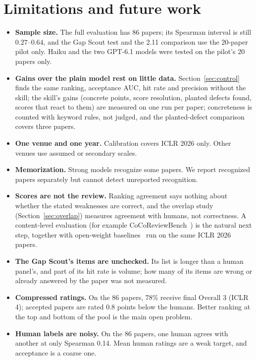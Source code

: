 \documentclass[11pt,a4paper]{article}
\begin{document}
\section{Limitations and future work}
\begin{itemize}
\item \textbf{Sample size.} The full evaluation has 86 papers; its Spearman interval is still
$0.27$--$0.64$, and the Gap Scout test and the 2.11 comparison use the 20-paper pilot only.
Haiku and the two GPT-6.1 models were tested on the pilot's 20 papers only.
\item \textbf{Gains over the plain model rest on little data.} Section~\ref{sec:control} finds
the same ranking, acceptance AUC, hit rate and precision without the skill; the skill's gains
(concrete points, score resolution, planted defects found, scores that react to them) are
measured on one run per paper; concreteness is counted with keyword rules, not judged, and the
planted-defect comparison covers three papers.
\item \textbf{One venue and one year.} Calibration covers ICLR 2026 only. Other venues use
assumed or secondary scales.
\item \textbf{Memorization.} Strong models recognize some papers. We report recognized papers
separately but cannot detect unreported recognition.
\item \textbf{Scores are not the review.} Ranking agreement says nothing about whether the stated
weaknesses are correct, and the overlap study (Section~\ref{sec:overlap}) measures agreement with
humans, not correctness. A content-level evaluation (for example
CoCoReviewBench~\citep{deng2026cocoreviewbench}) is the natural next step, together with
open-weight baselines~\citep{zhu2025deepreview,weng2025cycleresearcher} run on the same ICLR 2026
papers.
\item \textbf{The Gap Scout's items are unchecked.} Its list is longer than a human panel's,
and part of its hit rate is volume; how many of its items are wrong or already answered by the
paper was not measured.
\item \textbf{Compressed ratings.} On the 86 papers, 78\% receive final Overall 3 (ICLR 4);
accepted papers are rated 0.8 points below the humans. Better ranking at the top and bottom of
the pool is the main open problem.
\item \textbf{Human labels are noisy.} On the 86 papers, one human agrees with another at only
Spearman 0.14. Mean human ratings are a weak target, and acceptance is a coarse one.
\end{itemize}
\end{document}
